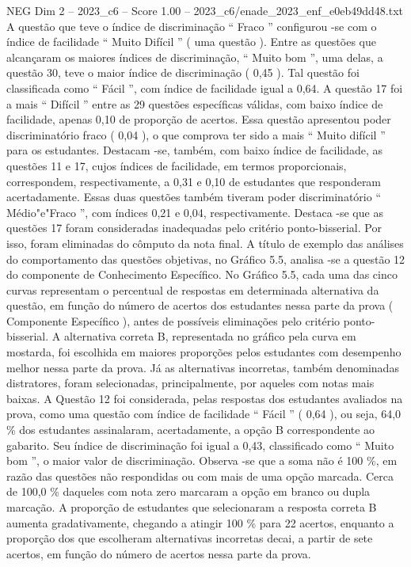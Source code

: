 \begin{textsample}{NEG Dim 2 – 2023\_c6 – Score 1.00 – 2023\_c6/enade\_2023\_enf\_e0eb49dd48.txt}
A questão que teve o índice de discriminação “ Fraco ” configurou -se com o índice de facilidade “ Muito Difícil ” ( uma questão ).
Entre as questões que alcançaram os maiores índices de discriminação, “ Muito bom ”, uma delas, a questão 30, teve o maior índice de discriminação ( 0,45 ).
Tal questão foi classificada como “ Fácil ”, com índice de facilidade igual a 0,64.
A questão 17 foi a mais “ Difícil ” entre as 29 questões específicas válidas, com baixo índice de facilidade, apenas 0,10 de proporção de acertos.
Essa questão apresentou poder discriminatório fraco ( 0,04 ), o que comprova ter sido a mais “ Muito difícil ” para os estudantes.
Destacam -se, também, com baixo índice de facilidade, as questões 11 e 17, cujos índices de facilidade, em termos proporcionais, correspondem, respectivamente, a 0,31 e 0,10 de estudantes que responderam acertadamente.
Essas duas questões também tiveram poder discriminatório “ Médio"e"Fraco ”, com índices 0,21 e 0,04, respectivamente.
Destaca -se que as questões 17 foram consideradas inadequadas pelo critério ponto-bisserial.
Por isso, foram eliminadas do cômputo da nota final.
A título de exemplo das análises do comportamento das questões objetivas, no Gráfico 5.5, analisa -se a questão 12 do componente de Conhecimento Específico.
No Gráfico 5.5, cada uma das cinco curvas representam o percentual de respostas em determinada alternativa da questão, em função do número de acertos dos estudantes nessa parte da prova ( Componente Específico ), antes de possíveis eliminações pelo critério ponto-bisserial.
A alternativa correta B, representada no gráfico pela curva em mostarda, foi escolhida em maiores proporções pelos estudantes com desempenho melhor nessa parte da prova.
Já as alternativas incorretas, também denominadas distratores, foram selecionadas, principalmente, por aqueles com notas mais baixas.
A Questão 12 foi considerada, pelas respostas dos estudantes avaliados na prova, como uma questão com índice de facilidade “ Fácil ” ( 0,64 ), ou seja, 64,0 \% dos estudantes assinalaram, acertadamente, a opção B correspondente ao gabarito.
Seu índice de discriminação foi igual a 0,43, classificado como “ Muito bom ”, o maior valor de discriminação.
Observa -se que a soma não é 100 \%, em razão das questões não respondidas ou com mais de uma opção marcada.
Cerca de 100,0 \% daqueles com nota zero marcaram a opção em branco ou dupla marcação.
A proporção de estudantes que selecionaram a resposta correta B aumenta gradativamente, chegando a atingir 100 \% para 22 acertos, enquanto a proporção dos que escolheram alternativas incorretas decai, a partir de sete acertos, em função do número de acertos nessa parte da prova.

\end{textsample}
